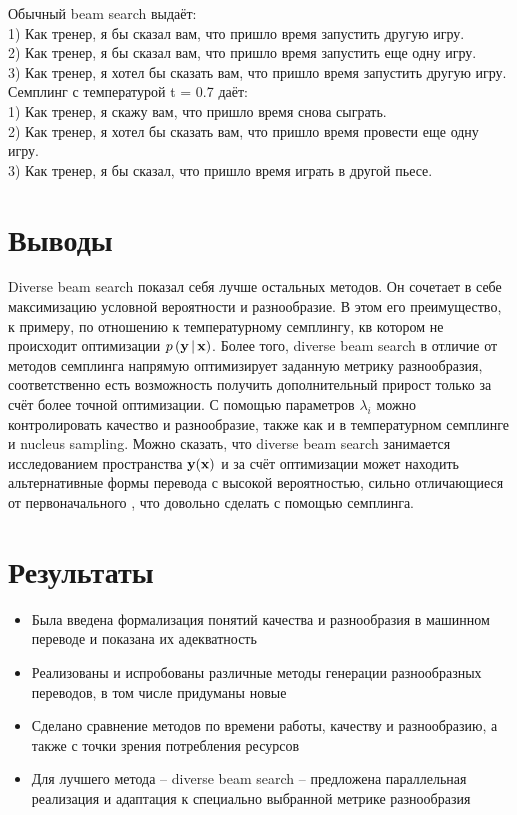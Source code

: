 \documentclass[a4paper, 12pt]{extarticle}
\begin{document}
Обычный beam search выдаёт:\\
1) Как тренер, я бы сказал вам, что пришло время запустить другую игру.\\
2) Как тренер, я бы сказал вам, что пришло время запустить еще одну игру.\\
3) Как тренер, я хотел бы сказать вам, что пришло время запустить другую игру.\\

Семплинг с температурой t = 0.7 даёт: \\
1) Как тренер, я скажу вам, что пришло время снова сыграть.\\
2) Как тренер, я хотел бы сказать вам, что пришло время провести еще одну игру.\\
3) Как тренер, я бы сказал, что пришло время играть в другой пьесе.\\

\section{Выводы}
    Diverse beam search показал себя лучше остальных методов. Он сочетает в себе максимизацию условной вероятности и разнообразие. В этом его преимущество, к примеру, по отношению к температурному семплингу, кв котором не происходит оптимизации $p\, (\bold{y} \, | \, \bold{x})$. Более того, diverse beam search в отличие от методов семплинга напрямую оптимизирует заданную метрику разнообразия, соответственно есть возможность получить дополнительный прирост только за счёт более точной оптимизации. С помощью параметров $\lambda_i$ можно контролировать качество и разнообразие, также как и в температурном семплинге и nucleus sampling. Можно сказать, что diverse beam search занимается исследованием пространства $\bold{y}(\bold{x})$ и за счёт оптимизации может находить альтернативные формы перевода с высокой вероятностью, сильно отличающиеся от первоначального , что довольно сделать с помощью семплинга.

\section{Результаты}
\begin{itemize}
\item Была введена формализация понятий качества и разнообразия в машинном переводе и показана их адекватность
\item Реализованы и испробованы различные методы генерации разнообразных переводов, в том числе придуманы новые
\item Сделано сравнение методов по времени работы, качеству и разнообразию, а также с точки зрения потребления ресурсов
\item Для лучшего метода -- diverse beam search -- предложена параллельная реализация и адаптация к специально выбранной метрике разнообразия
\end{itemize}

\newpage
\renewcommand{\bibname}{Список литературы}
\addcontentsline{toc}{section}{\bibname}

\def\BibUrl#1.{}\def\BibAnnote#1.{}
\def\BibUrl#1{\\{\footnotesize\tt\def~{\char126} http://#1}}



\end{document}
